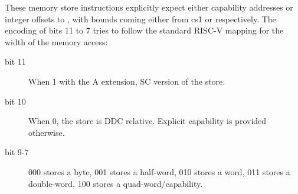 {














\vspace{1em}


These memory store instructions explicitly expect either capability addresses
or integer offsets to \DDC{}, with bounds coming either from cs1 or \DDC{}
respectively. The encoding of bits 11 to 7 tries to follow the standard RISC-V
mapping for the width of the memory access:
\begin{description}
\item [bit 11] When 1 with the A extension, SC version of the store.
\item [bit 10] When 0, the store is DDC relative. Explicit capability is provided otherwise.
\item [bit 9-7] 000 stores a byte, 001 stores a half-word, 010 stores a word, 011 stores a double-word, 100 stores a quad-word/capability.
\end{description}

\vspace{1em}

\rvcheriheader
{}







}
